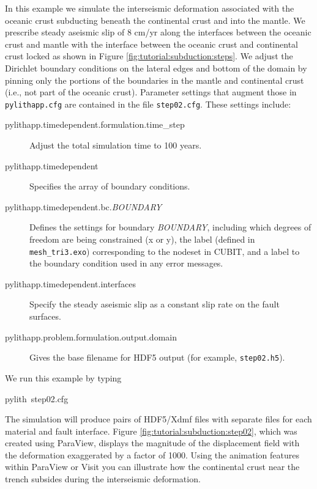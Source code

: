 In this example we simulate the interseismic deformation associated
with the oceanic crust subducting beneath the continental crust and
into the mantle. We prescribe steady aseismic slip of 8 cm/yr along
the interfaces between the oceanic crust and mantle with the interface
between the oceanic crust and continental crust locked as shown in
Figure \ref{fig:tutorial:subduction:steps}. We adjust the Dirichlet
boundary conditions on the lateral edges and bottom of the domain
by pinning only the portions of the boundaries in the mantle and continental
crust (i.e., not part of the oceanic crust). Parameter settings that
augment those in \texttt{pylithapp.cfg} are contained in the file
\texttt{step02.cfg}. These settings include:
\begin{description}
\item [{pylithapp.timedependent.formulation.time\_step}] Adjust the total
simulation time to 100 years.
\item [{pylithapp.timedependent}] Specifies the array of boundary conditions.
\item [{pylithapp.timedependent.bc.\textit{BOUNDARY}}] Defines the settings
for boundary \textit{BOUNDARY}, including which degrees of freedom
are being constrained (x or y), the label (defined in\texttt{ mesh\_tri3.exo})
corresponding to the nodeset in CUBIT, and a label to the boundary
condition used in any error messages.
\item [{pylithapp.timedependent.interfaces}] Specify the steady aseismic
slip as a constant slip rate on the fault surfaces. 
\item [{pylithapp.problem.formulation.output.domain}] Gives the base filename
for HDF5 output (for example, \texttt{step02.h5}).
\end{description}
We run this example by typing
\begin{lyxcode}
pylith~step02.cfg
\end{lyxcode}
The simulation will produce pairs of HDF5/Xdmf files with separate
files for each material and fault interface. Figure \ref{fig:tutorial:subduction:step02},
which was created using ParaView, displays the magnitude of the displacement
field with the deformation exaggerated by a factor of 1000. Using
the animation features within ParaView or Visit you can illustrate
how the continental crust near the trench subsides during the interseismic
deformation. 

